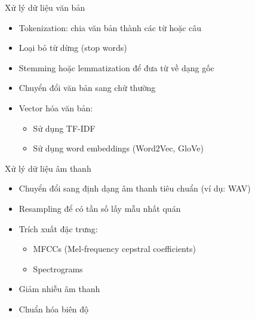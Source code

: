 \documentclass{beamer}
\begin{document}
\begin{frame}{Xử lý dữ liệu văn bản}
    \begin{itemize}
        \item Tokenization: chia văn bản thành các từ hoặc câu
        \item Loại bỏ từ dừng (stop words)
        \item Stemming hoặc lemmatization để đưa từ về dạng gốc
        \item Chuyển đổi văn bản sang chữ thường
        \item Vector hóa văn bản:
        \begin{itemize}
            \item Sử dụng TF-IDF
            \item Sử dụng word embeddings (Word2Vec, GloVe)
        \end{itemize}
    \end{itemize}
\end{frame}

\begin{frame}{Xử lý dữ liệu âm thanh}
    \begin{itemize}
        \item Chuyển đổi sang định dạng âm thanh tiêu chuẩn (ví dụ: WAV)
        \item Resampling để có tần số lấy mẫu nhất quán
        \item Trích xuất đặc trưng:
        \begin{itemize}
            \item MFCCs (Mel-frequency cepstral coefficients)
            \item Spectrograms
        \end{itemize}
        \item Giảm nhiễu âm thanh
        \item Chuẩn hóa biên độ
    \end{itemize}
\end{frame}
\end{document}

